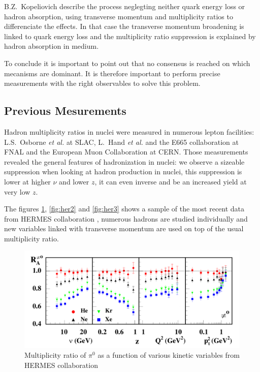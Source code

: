 B.Z.~Kopeliovich \cite{Kopeliovich:2008uy} describe the process neglegting neither quark 
energy loss or hadron absorption, using transverse momentum and
multiplicity ratios to differenciate the effects. In that case the transverse 
momentum broadening is linked to quark energy loss and the multiplicity ratio
suppression is explained by hadron absorption in medium.

To conclude it is important to point out that no consensus is reached on which 
mecanisms are dominant. It is therefore important to perform precise measurements with
the right observables to solve this problem.


\subsection{Previous Mesurements}
\label{sec:exp}

Hadron multiplicity ratios in nuclei were measured in numerous lepton 
facilities: L.S.~Osborne {\it et al.} \cite{Osborne:1978ai} at SLAC,
L.~Hand {\it et al.} \cite{Hand:1978tx} and the E665 collaboration \cite{Adams:1994ri} at FNAL
and the European Muon Collaboration \cite{Arvidson:1984fz,Ashman:1991cx} at CERN. Those 
measurements revealed the general features of hadronization
in nuclei: we observe a sizeable suppression when
looking at hadron production in nuclei, this suppression is lower at higher
$\nu$ and lower $z$, it can even inverse and be an increased yield at very low $z$. 

The figures \ref{fig:her1}, \ref{fig:her2} and \ref{fig:her3} shows a sample of 
the most recent data from HERMES collaboration \cite{Airapetian:2007vu}, numerous 
hadrons are studied individually and new variables linked with transverse 
momentum are used on top of the usual multiplicity ratio.

\begin{figure}[htbp]
\centering
\includegraphics[width=14cm] {fig/Hermes/pi0hermes.png} 
\caption {Multiplicity ratio of $\pi^0$ as a function of various kinetic 
variables from HERMES collaboration \cite{Airapetian:2003mi}}
\label{fig:her1}
\end{figure}

